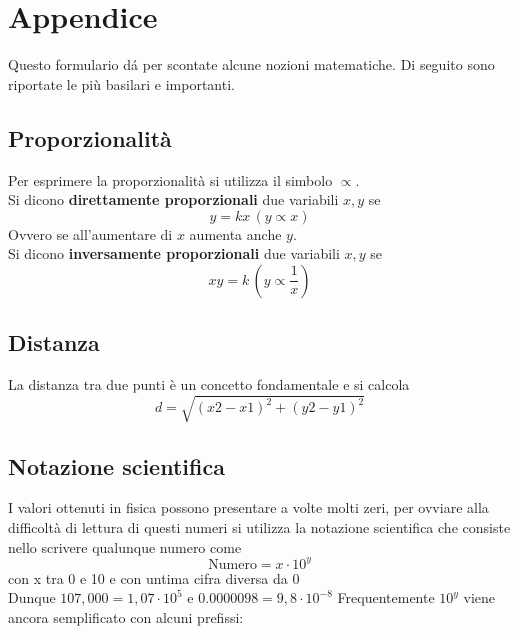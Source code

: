 
\section{Appendice}
Questo formulario dá per scontate alcune nozioni matematiche. Di seguito sono riportate le più
basilari e importanti.

\subsection{Proporzionalità}
Per esprimere la proporzionalità si utilizza il simbolo $\propto$.\\
Si dicono \textbf{direttamente proporzionali} due variabili $x,y$ se
\begin{equation*}
y = kx\,(y\propto x)
\end{equation*}
Ovvero se all'aumentare di $x$ aumenta anche $y$.\\ [\baselineskip]
Si dicono \textbf{inversamente proporzionali} due variabili $x,y$ se 
\begin{equation*}
xy = k\,\left(y\propto\frac{1}{x}\right)
\end{equation*}
  
\subsection{Distanza}

La distanza tra due punti è un concetto fondamentale e si calcola 
\begin{equation*}
d=\sqrt{(x2-x1)^{2}+(y2-y1)^{2}}
\end{equation*}
\begin{center}     
\end{center}

\subsection{Notazione scientifica}
I valori ottenuti in fisica possono presentare a volte molti zeri, per ovviare alla difficoltà di 
lettura di questi numeri si utilizza la notazione scientifica che consiste nello scrivere qualunque
numero come 
\begin{equation*}
\text{Numero}=x\cdot 10^{y}
\end{equation*}
con x tra 0 e 10 e con untima cifra diversa da 0\\
Dunque $107,000=1,07\cdot10^{5}$ e $0.0000098=9,8\cdot10^{-8}$ 
Frequentemente $10^{y}$ viene ancora semplificato con alcuni prefissi:

